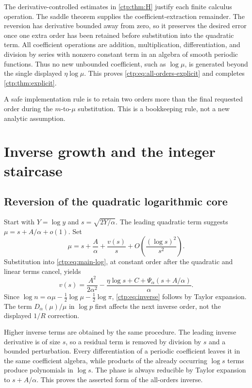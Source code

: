 \documentclass[11pt,a4paper]{article}
\numberwithin{equation}{section}
\theoremstyle{definition}
\theoremstyle{remark}
\begin{document}
The derivative-controlled estimates in \cref{ctp:thm:H} justify each finite
calculus operation. The saddle theorem supplies the coefficient-extraction
remainder. The reversion has derivative bounded away from zero, so it
preserves the desired error once one extra order has been retained before
substitution into the quadratic term. All coefficient operations are
addition, multiplication, differentiation, and division by series with
nonzero constant term in an algebra of smooth periodic functions. Thus
no new unbounded coefficient, such as $\log\mu$, is generated beyond the
single displayed $\eta\log\mu$. This proves
\eqref{ctp:eq:all-orders-explicit} and completes \cref{ctp:thm:explicit}.

A safe implementation rule is to retain two orders more than the final
requested order during the $m$-to-$\mu$ substitution. This is a bookkeeping
rule, not a new analytic assumption.

\section{Inverse growth and the integer staircase}
\label{ctp:sec:inverse-proof}

\subsection{Reversion of the quadratic logarithmic core}
Start with $Y=\log y$ and $s=\sqrt{2Y/\alpha}$. The leading quadratic
term suggests $\mu=s+A/\alpha+o(1)$. Set
\[
 \mu=s+\frac A\alpha+\frac{v(s)}s+
 O\!\left(\frac{(\log s)^2}{s^2}\right).
\]
Substitution into \eqref{ctp:eq:main-log}, at constant order after the
quadratic and linear terms cancel, yields
\begin{equation}\label{ctp:eq:v-inverse}
 v(s)=\frac{A^2}{2\alpha^2}
 -\frac{\eta\log s+C+\Psi_\alpha(s+A/\alpha)}\alpha.
\end{equation}
Since $\log n=\alpha\mu-\tfrac12\log\mu-\tfrac12\log\pi$,
\eqref{ctp:eq:inverse} follows by Taylor expansion. The term
$D_\alpha(\mu)/\mu$ in $\log p$ first affects the next inverse order,
not the displayed $1/R$ correction.

Higher inverse terms are obtained by the same procedure. The leading
inverse derivative is of size $s$, so a residual term is removed by
division by $s$ and a bounded perturbation. Every differentiation of a
periodic coefficient leaves it in the same coefficient algebra, while
products of the already occurring $\log s$ terms produce polynomials in
$\log s$. The phase is always reducible by Taylor expansion to
$s+A/\alpha$. This proves the asserted form of the all-orders inverse.
\end{document}

